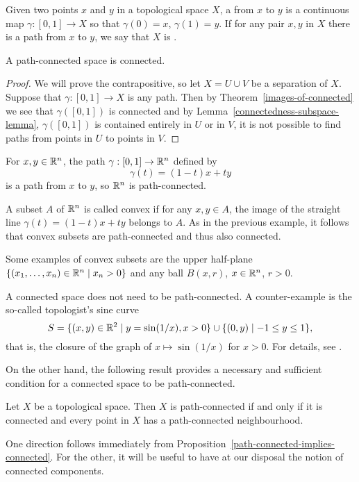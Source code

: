 \begin{defn}
  Given two points $x$ and $y$ in a topological space $X$, a  from $x$ to $y$ is a continuous map $\gamma : [0,1] \to X$ so that $\gamma(0) = x$, $\gamma(1) = y$. If for any pair $x,y$ in $X$ there is a path from $x$ to $y$, we say that $X$ is .
\end{defn}
\begin{prop}
  \label{path-connected-implies-connected}
  A path-connected space is connected.
\end{prop}
\begin{proof}
  We will prove the contrapositive, so let $X = U \cup V$ be a separation of $X$. Suppose that $\gamma : [0,1] \to X$ is any path. Then by Theorem~\ref{images-of-connected} we see that $\gamma([0,1])$ is connected and by Lemma~\ref{connectedness-subspace-lemma}, $\gamma([0,1])$ is contained entirely in $U$ or in $V$, it is not possible to find paths from points in $U$ to points in $V$.
\end{proof}
\begin{example}
  For $x, y \in \mathbb{R}^n$, the path $\gamma : [0,1] \to \mathbb{R}^n$ defined by
  \[
    \gamma(t) = (1-t)x + ty
  \]
  is a path from $x$ to $y$, so $\mathbb{R}^n$ is path-connected.
\end{example}
\begin{example}
  A subset $A$ of $\mathbb{R}^n$ is called convex if for any $x,y \in A$, the image of the straight line $\gamma(t) = (1-t)x + ty$ belongs to $A$. As in the previous example, it follows that convex subsets are path-connected and thus also connected.
  
  Some examples of convex subsets are the upper half-plane $\{(x_1,\dots,x_n) \in \mathbb{R}^n \mid x_n > 0\}$ and any ball $B(x,r)$, $x \in \mathbb{R}^n$, $r > 0$.
\end{example}
\begin{example}
  A connected space does not need to be path-connected. A counter-example is the so-called topologist's sine curve
  \[
    S = \{(x,y) \in \mathbb{R}^2 \mid y = \sin(1/x), x > 0 \} \cup \{(0,y) \mid -1 \leq y \leq 1 \},
  \]
  that is, the closure of the graph of $x \mapsto \sin(1/x)$ for $x > 0$. For details, see \cite[\S 24]{Mun}.
\end{example}
On the other hand, the following result provides a necessary and sufficient condition for a connected space to be path-connected.
\begin{thm}
  Let $X$ be a topological space. Then $X$ is path-connected if and only if it is connected and every point in $X$ has a path-connected neighbourhood.
\end{thm}
One direction follows immediately from Proposition~\ref{path-connected-implies-connected}. For the other, it will be useful to have at our disposal the notion of connected components.

